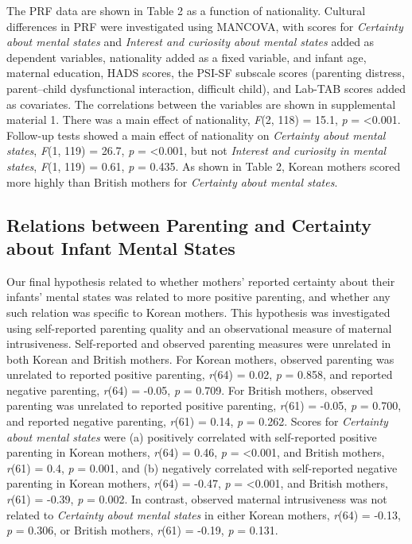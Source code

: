 \documentclass[
]{article}
\begin{document}
The PRF data are shown in Table 2 as a function of nationality. Cultural differences in PRF were investigated using MANCOVA, with scores for \emph{Certainty about mental states} and \emph{Interest and curiosity about mental states} added as dependent variables, nationality added as a fixed variable, and infant age, maternal education, HADS scores, the PSI-SF subscale scores (parenting distress, parent--child dysfunctional interaction, difficult child), and Lab-TAB scores added as covariates. The correlations between the variables are shown in supplemental material 1. There was a main effect of nationality, \emph{F}(2, 118) = 15.1, \emph{p} = \textless0.001.
Follow-up tests showed a main effect of nationality on \emph{Certainty about mental states},
\emph{F}(1, 119) = 26.7, \emph{p} = \textless0.001, but not \emph{Interest and curiosity in mental states},
\emph{F}(1, 119) = 0.61, \emph{p} = 0.435. As shown in Table 2,
Korean mothers scored more highly than British mothers for \emph{Certainty about mental states}.

\hypertarget{relations-between-parenting-and-certainty-about-infant-mental-states}{%
\subsection*{Relations between Parenting and Certainty about Infant Mental States}\label{relations-between-parenting-and-certainty-about-infant-mental-states}}

Our final hypothesis related to whether mothers' reported certainty about their infants' mental states was related to more positive parenting, and whether any such relation was specific to Korean mothers. This hypothesis was investigated using self-reported parenting quality and an observational measure of maternal intrusiveness. Self-reported and observed parenting measures were unrelated in both Korean and British mothers.
For Korean mothers, observed parenting was unrelated to reported positive parenting, \emph{r}(64) = 0.02, \emph{p} = 0.858, and reported negative parenting,
\emph{r}(64) = -0.05, \emph{p} = 0.709.
For British mothers, observed parenting was unrelated to reported positive parenting, \emph{r}(61) = -0.05, \emph{p} = 0.700, and reported negative parenting,
\emph{r}(61) = 0.14, \emph{p} = 0.262.
Scores for \emph{Certainty about mental states} were (a) positively correlated with self-reported positive parenting in Korean mothers, \emph{r}(64) = 0.46, \emph{p} = \textless0.001, and British mothers, \emph{r}(61) = 0.4, \emph{p} = 0.001,
and (b) negatively correlated with self-reported negative parenting in Korean mothers, \emph{r}(64) = -0.47, \emph{p} = \textless0.001, and British mothers, \emph{r}(61) = -0.39, \emph{p} = 0.002.
In contrast, observed maternal intrusiveness was not related to \emph{Certainty about mental states} in either Korean mothers, \emph{r}(64) = -0.13, \emph{p} = 0.306, or British mothers, \emph{r}(61) = -0.19, \emph{p} = 0.131.
\end{document}
